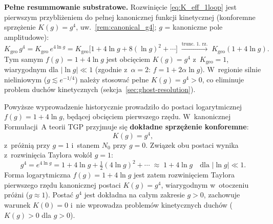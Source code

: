 \medskip\noindent
\textbf{Pełne resummowanie substratowe.}
Rozwinięcie \eqref{eq:K_eff_1loop} jest pierwszym przybliżeniem
do pełnej kanonicznej funkcji kinetycznej (konforemne sprz\k{e}\.zenie
$K(g)=g^4$, uw.~\ref{rem:canonical_g4}; $g$ = kanoniczne pole amplitudowe):
\begin{equation}
  K_\mathrm{geo}\,g^4
  = K_\mathrm{geo}\,e^{4\ln g}
  = K_\mathrm{geo}\bigl[1 + 4\ln g
    + 8(\ln g)^2 + \cdots\bigr]
  \;\xrightarrow{\text{trunc. 1. rz.}}\;
  K_\mathrm{geo}(1 + 4\ln g).
  \label{eq:Ksub_expansion_check}
\end{equation}
Tym samym $f(g) = 1 + 4\ln g$ jest obcięciem $K(g)=g^4$
z~$K_\mathrm{geo} = 1$, wiarygodnym dla $|\ln g| \ll 1$
(zgodnie z~$\alpha=2$: $f=1+2\alpha\ln g$).
W~regionie silnie nieliniowym ($g \lesssim e^{-1/4}$) należy
stosować pełne $K(g) = g^4 > 0$, co eliminuje
problem duchów kinetycznych (sekcja~\ref{sec:ghost-resolution}).

\begin{uwaga}[Nota kanoniczna: $K(g) = g^4$ jako dokładne sprzężenie konforemne]
\label{rem:canonical_g4}
Powyższe wyprowadzenie historycznie prowadziło do postaci logarytmicznej
$f(g) = 1 + 4\ln g$, będącej obcięciem pierwszego rzędu. W~kanonicznej
Formułacji~A teorii TGP przyjmuje się \textbf{dokładne sprzężenie konforemne}:
\begin{equation}
  K(g) = g^4,
  \label{eq:K_canonical_g4}
\end{equation}
z~próżnią przy $g = 1$ i~stanem $N_0$ przy $g = 0$.
Związek obu postaci wynika z~rozwinięcia Taylora wokół $g = 1$:
\begin{equation}
  g^4 = e^{4\ln g}
  = 1 + 4\ln g + \tfrac{1}{2}(4\ln g)^2 + \cdots
  \;\approx\; 1 + 4\ln g
  \quad\text{dla } |\ln g| \ll 1.
\end{equation}
Forma logarytmiczna $f(g) = 1 + 4\ln g$ jest zatem rozwinięciem Taylora
pierwszego rzędu kanonicznej postaci $K(g) = g^4$, wiarygodnym w~otoczeniu
próżni ($g \approx 1$). Postać $g^4$ jest dokładna na całym zakresie $g > 0$,
zachowuje warunek $K(0) = 0$ i~nie wprowadza problemów kinetycznych duchów
($K(g) > 0$ dla $g > 0$).
\end{uwaga}

